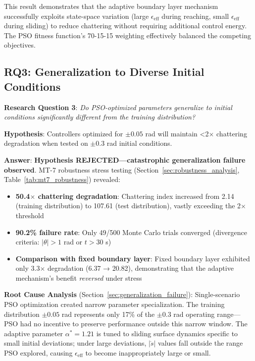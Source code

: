 This result demonstrates that the adaptive boundary layer mechanism successfully exploits state-space variation (large $\epsilon_{\text{eff}}$ during reaching, small $\epsilon_{\text{eff}}$ during sliding) to reduce chattering without requiring additional control energy. The PSO fitness function's 70-15-15 weighting effectively balanced the competing objectives.

\subsection{RQ3: Generalization to Diverse Initial Conditions}
\label{subsec:answer_rq3}

\textbf{Research Question 3}: \textit{Do PSO-optimized parameters generalize to initial conditions significantly different from the training distribution?}

\textbf{Hypothesis}: Controllers optimized for $\pm0.05$ rad will maintain <2$\times$ chattering degradation when tested on $\pm0.3$ rad initial conditions.

\textbf{Answer}: \textbf{Hypothesis REJECTED—catastrophic generalization failure observed}. MT-7 robustness stress testing (Section~\ref{sec:robustness_analysis}, Table~\ref{tab:mt7_robustness}) revealed:
\begin{itemize}
    \item \textbf{50.4$\times$ chattering degradation}: Chattering index increased from 2.14 (training distribution) to 107.61 (test distribution), vastly exceeding the 2$\times$ threshold
    \item \textbf{90.2\% failure rate}: Only 49/500 Monte Carlo trials converged (divergence criteria: $|\theta| > 1$ rad or $t > 30$ s)
    \item \textbf{Comparison with fixed boundary layer}: Fixed boundary layer exhibited only 3.3$\times$ degradation (6.37 → 20.82), demonstrating that the adaptive mechanism's benefit \textit{reversed} under stress
\end{itemize}

\textbf{Root Cause Analysis} (Section~\ref{sec:generalization_failure}): Single-scenario PSO optimization created narrow parameter specialization. The training distribution $\pm0.05$ rad represents only 17\% of the $\pm0.3$ rad operating range—PSO had no incentive to preserve performance outside this narrow window. The adaptive parameter $\alpha^* = 1.21$ is tuned to sliding surface dynamics specific to small initial deviations; under large deviations, $|\dot{s}|$ values fall outside the range PSO explored, causing $\epsilon_{\text{eff}}$ to become inappropriately large or small.

